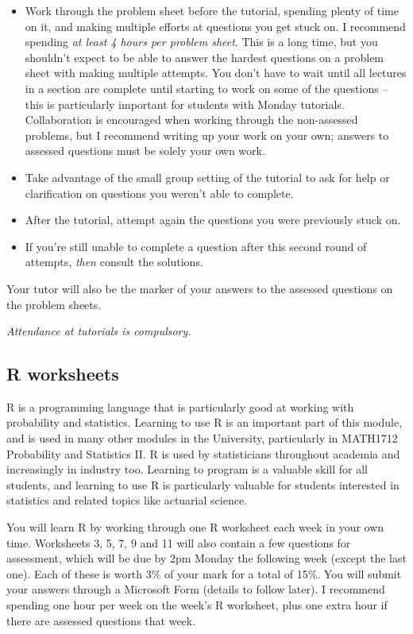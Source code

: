 \documentclass[
  a4paper,
]{book}
\providecommand{\tightlist}{%
  \setlength{\itemsep}{0pt}\setlength{\parskip}{0pt}}
\theoremstyle{definition}
\theoremstyle{definition}
\theoremstyle{definition}
\theoremstyle{definition}
\theoremstyle{remark}
\begin{document}
\begin{itemize}
\tightlist
\item
  Work through the problem sheet before the tutorial, spending plenty of time on it, and making multiple efforts at questions you get stuck on. I recommend spending \emph{at least 4 hours per problem sheet}. This is a long time, but you shouldn't expect to be able to answer the hardest questions on a problem sheet with making multiple attempts. You don't have to wait until all lectures in a section are complete until starting to work on some of the questions -- this is particularly important for students with Monday tutorials. Collaboration is encouraged when working through the non-assessed problems, but I recommend writing up your work on your own; answers to assessed questions must be solely your own work.
\item
  Take advantage of the small group setting of the tutorial to ask for help or clarification on questions you weren't able to complete.
\item
  After the tutorial, attempt again the questions you were previously stuck on.
\item
  If you're still unable to complete a question after this second round of attempts, \emph{then} consult the solutions.
\end{itemize}

Your tutor will also be the marker of your answers to the assessed questions on the problem sheets.

\emph{Attendance at tutorials is compulsory.}

\hypertarget{r-worksheets}{%
\subsection*{R worksheets}\label{r-worksheets}}

R is a programming language that is particularly good at working with probability and statistics. Learning to use R is an important part of this module, and is used in many other modules in the University, particularly in MATH1712 Probability and Statistics II. R is used by statisticians throughout academia and increasingly in industry too. Learning to program is a valuable skill for all students, and learning to use R is particularly valuable for students interested in statistics and related topics like actuarial science.

You will learn R by working through one R worksheet each week in your own time. Worksheets 3, 5, 7, 9 and 11 will also contain a few questions for assessment, which will be due by 2pm Monday the following week (except the last one). Each of these is worth 3\% of your mark for a total of 15\%. You will submit your answers through a Microsoft Form (details to follow later). I recommend spending one hour per week on the week's R worksheet, plus one extra hour if there are assessed questions that week.
\end{document}
